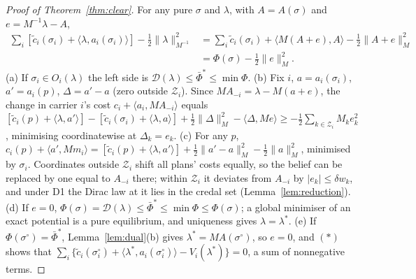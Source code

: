 \documentclass[preprint,12pt]{elsarticle}
\theoremstyle{definition}
\theoremstyle{remark}
\newcommand{\ip}[2]{\langle #1,#2\rangle}
\begin{document}
\begin{proof}[Proof of Theorem~\ref{thm:clear}]
For any pure $\sigma$ and $\lambda$, with $A=A(\sigma)$ and $e=M^{-1}\lambda-A$,
\begin{align*}
\textstyle\sum_i[\tilde c_i(\sigma_i)+\ip{\lambda}{a_i(\sigma_i)}]-\tfrac12\|\lambda\|^2_{M^{-1}}
&=\textstyle\sum_i\tilde c_i(\sigma_i)+\ip{M(A+e)}{A}-\tfrac12\|A+e\|_M^2\\
&=\Phi(\sigma)-\tfrac12\|e\|_M^2.\tag{$\ast$}
\end{align*}
(a) If $\sigma_i\in O_i(\lambda)$ the left side is $\mathcal D(\lambda)\le\bar\Phi^*\le\min\Phi$. (b) Fix $i$, $a=a_i(\sigma_i)$, $a'=a_i(p)$, $\Delta=a'-a$ (zero outside $\mathcal Z_i$). Since $MA_{-i}=\lambda-M(a+e)$, the change in carrier $i$'s cost $c_i+\ip{a_i}{MA_{-i}}$ equals $[\tilde c_i(p)+\ip{\lambda}{a'}]-[\tilde c_i(\sigma_i)+\ip{\lambda}{a}]+\tfrac12\|\Delta\|^2_M-\ip{\Delta}{Me}\ge-\tfrac12\sum_{k\in\mathcal Z_i}M_ke_k^2$, minimising coordinatewise at $\Delta_k=e_k$. (c) For any $p$, $c_i(p)+\ip{a'}{Mm_i}=[\tilde c_i(p)+\ip{\lambda}{a'}]+\tfrac12\|a'-a\|^2_M-\tfrac12\|a\|^2_M$, minimised by $\sigma_i$. Coordinates outside $\mathcal Z_i$ shift all plans' costs equally, so the belief can be replaced by one equal to $A_{-i}$ there; within $\mathcal Z_i$ it deviates from $A_{-i}$ by $|e_k|\le\delta w_k$, and under D1 the Dirac law at it lies in the credal set (Lemma~\ref{lem:reduction}). (d) If $e=0$, $\Phi(\sigma)=\mathcal D(\lambda)\le\bar\Phi^*\le\min\Phi\le\Phi(\sigma)$; a global minimiser of an exact potential is a pure equilibrium, and uniqueness gives $\lambda=\lambda^*$. (e) If $\Phi(\sigma^\circ)=\bar\Phi^*$, Lemma~\ref{lem:dual}(b) gives $\lambda^*=MA(\sigma^\circ)$, so $e=0$, and $(\ast)$ shows that $\sum_i\{\tilde c_i(\sigma^\circ_i)+\ip{\lambda^*}{a_i(\sigma^\circ_i)}-V_i(\lambda^*)\}=0$, a sum of nonnegative terms.
\end{proof}
\end{document}
